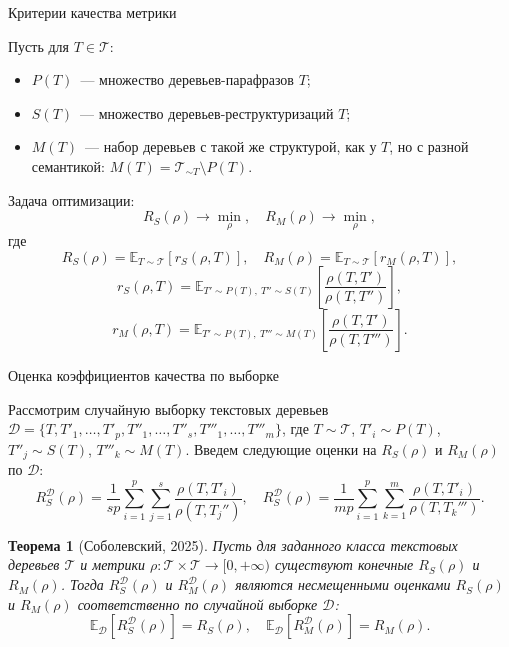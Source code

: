 \documentclass{beamer}
\newcommand{\E}{\mathbb{E}}
\newtheorem{Th}{Теорема}
\begin{document}

\begin{frame}{Критерии качества метрики}

Пусть для $T\in\mathcal{T}$:
\begin{itemize}
    \item $P(T)$~--- множество деревьев-парафразов $T$;
    \item $S(T)$~--- множество деревьев-реструктуризаций $T$; 
    \item $M(T)$~--- набор деревьев с такой же структурой, как у $T$, но с разной семантикой: $M(T) = \mathcal{T}_{\sim T} \setminus P(T)$.
\end{itemize}
Задача оптимизации:
$$
R_S(\rho) \longrightarrow \min_\rho, \quad  R_M(\rho) \longrightarrow \min_\rho,
$$
где
$$
R_S(\rho) = \E_{T\sim \mathcal{T}}[r_S(\rho, T)], \quad R_M(\rho) = \E_{T\sim \mathcal{T}}[r_M(\rho, T)],
$$
$$
r_S(\rho, T) = \E_{T'\sim P(T), \ T''\sim S(T)} \left[\frac{\rho(T, T')}{\rho(T, T'')}\right],
$$
$$
r_M(\rho, T) = \E_{T'\sim P(T), \ T'''\sim M(T)} \left[\frac{\rho(T, T')}{\rho(T, T''')}\right].
$$

\end{frame}


\begin{frame}{Оценка коэффициентов качества по выборке}

Рассмотрим случайную выборку текстовых деревьев $\mathcal{D} = \{T, T'_1, \dots, T'_p, T''_1, \dots, T''_s, T'''_1, \dots, T'''_m\}$, где $T\sim \mathcal{T}$, $T'_i\sim P(T)$, $T''_j\sim S(T)$, $T'''_k\sim M(T)$. Введем следующие оценки на $R_S(\rho)$ и $R_M(\rho)$ по $\mathcal{D}$:
$$
R^\mathcal{D}_S(\rho) = \frac{1}{sp}\sum\limits_{i=1}^p\sum\limits_{j=1}^s\frac{\rho(T, T'_i)}{\rho(T, T_j'')},
\quad R^\mathcal{D}_S(\rho) = \frac{1}{mp}\sum\limits_{i=1}^p\sum\limits_{k=1}^m\frac{\rho(T, T'_i)}{\rho(T, T_k''')}.
$$
\begin{Th}[Соболевский, 2025]
    Пусть для заданного класса текстовых деревьев $\mathcal{T}$ и метрики $\rho: \mathcal{T}\times\mathcal{T}\longrightarrow [0, +\infty)$ существуют конечные $R_S(\rho)$ и $R_M(\rho)$. Тогда $R_S^\mathcal{D}(\rho)$ и $R_M^\mathcal{D}(\rho)$ являются несмещенными оценками $R_S(\rho)$ и $R_M(\rho)$ соответственно по случайной выборке $\mathcal{D}$:
    $$
    \E_\mathcal{D}[R_S^\mathcal{D}(\rho)] = R_S(\rho), \quad \E_\mathcal{D}[R_M^\mathcal{D}(\rho)] = R_M(\rho).
    $$
\end{Th}
    
\end{frame}
\end{document}
